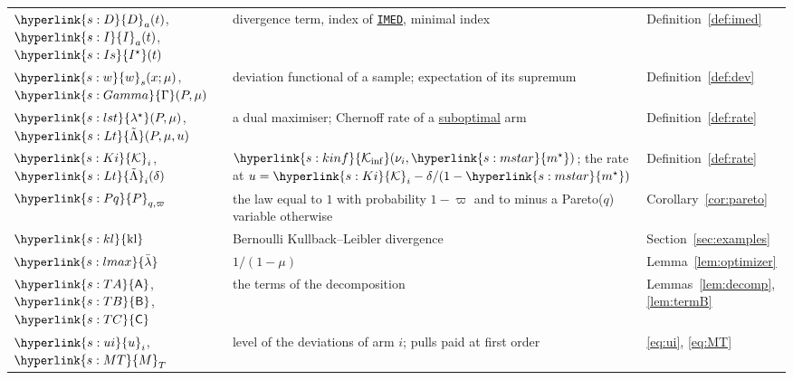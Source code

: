 \documentclass[11pt]{article}
\newcommand{\sy}[2]{{\hyperlink{#1}{#2}}}
\newcommand{\term}[2]{\hyperlink{#1}{#2}}
\newcommand{\imed}{\hyperref[alg:imed]{\texttt{IMED}}}
\newcommand{\ms}{\sy{s:mstar}{m^{\star}}}
\newcommand{\Kinf}{\sy{s:kinf}{\mathcal{K}_{\inf}}}
\newcommand{\Dv}{\sy{s:D}{D}}
\newcommand{\Ix}{\sy{s:I}{I}}
\newcommand{\Is}{\sy{s:Is}{I^{\star}}}
\newcommand{\ws}{\sy{s:w}{w}}
\newcommand{\Gam}{\sy{s:Gamma}{\Gamma}}
\newcommand{\lst}{\sy{s:lst}{\lambda^{\star}}}
\newcommand{\Lt}{\sy{s:Lt}{\tilde{\Lambda}}}
\newcommand{\Ki}{\sy{s:Ki}{\mathcal{K}}}
\newcommand{\Pq}{\sy{s:Pq}{P}}
\newcommand{\kl}{\sy{s:kl}{\mathrm{kl}}}
\newcommand{\lmax}{\sy{s:lmax}{\bar{\lambda}}}
\newcommand{\ui}{\sy{s:ui}{u}}
\newcommand{\MT}{\sy{s:MT}{M}}
\newcommand{\TA}{\sy{s:TA}{\mathsf{A}}}
\newcommand{\TB}{\sy{s:TB}{\mathsf{B}}}
\newcommand{\TC}{\sy{s:TC}{\mathsf{C}}}
\begin{document}
\begin{center}
\begin{tabular}{@{}p{}p{}p{}@{}}
$\Dv_a(t)$, $\Ix_a(t)$, $\Is(t)$ & divergence term, index of \imed{}, minimal index & Definition~\ref{def:imed} \\
$\ws_s(x;\mu)$, $\Gam(P,\mu)$ & deviation functional of a sample; expectation of its supremum & Definition~\ref{def:dev} \\
$\lst(P,\mu)$, $\Lt(P,\mu,u)$ & a dual maximiser; Chernoff rate of a \term{w:subopt}{suboptimal} arm & Definition~\ref{def:rate} \\
$\Ki_i$, $\Lt_i(\delta)$ & $\Kinf(\nu_i,\ms)$; the rate at $u=\Ki_i-\delta/(1-\ms)$ & Definition~\ref{def:rate} \\
$\Pq_{q,\varpi}$ & the law equal to $1$ with probability $1-\varpi$ and to minus a Pareto($q$) variable otherwise & Corollary~\ref{cor:pareto} \\
$\kl$ & Bernoulli Kullback--Leibler divergence & Section~\ref{sec:examples} \\
$\lmax$ & $1/(1-\mu)$ & Lemma~\ref{lem:optimizer} \\
$\TA$, $\TB$, $\TC$ & the terms of the decomposition & Lemmas~\ref{lem:decomp}, \ref{lem:termB} \\
$\ui_i$, $\MT_T$ & level of the deviations of arm $i$; pulls paid at first order & \eqref{eq:ui}, \eqref{eq:MT} \\
\bottomrule
\end{tabular}
\end{center}



\end{document}
